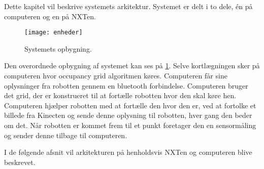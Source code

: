 Dette kapitel vil beskrive systemets arkitektur.
Systemet er delt i to dele, én på computeren og en på NXTen.


\begin{figure}[H]
\centering
\texttt{[image: enheder]}
\caption{Systemets opbygning.}
\label{arkitektur:opbygning}
\end{figure}

Den overordnede opbygning af systemet kan ses på \cref{arkitektur:opbygning}.
Selve kortlægningen sker på computeren hvor occupancy grid algoritmen køres.
Computeren får sine oplysninger fra robotten gennem en bluetooth forbindelse.
Computeren bruger det grid, der er konstrueret til at fortælle robotten hvor den skal køre hen.
Computeren hjælper robotten med at fortælle den hvor den er, ved at fortolke et billede fra Kinecten og sende denne oplysning til robotten, hver gang den beder om det.
Når robotten er kommet frem til et punkt foretager den en sensormåling og sender denne tilbage til computeren.

I de følgende afsnit vil arkitekturen på henholdsvis NXTen og computeren blive beskrevet.

